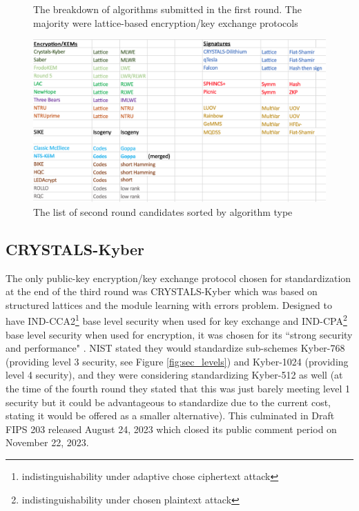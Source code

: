 \begin{figure}
    \centering
        {
            \captionsetup{justification=centering}
            \caption{The breakdown of algorithms submitted in the first round. The majority were lattice-based encryption/key exchange protocols \cite{moody_lets_2018}}
            \label{fig:algosbreakdown}
        }
\end{figure}
\begin{figure}
    \centering
    \includegraphics[width=0.75\linewidth]{Images/algos_sorted.png}
    \caption{The list of second round candidates sorted by algorithm type \cite{moody_round2}}
    \label{fig:algossorted}
\end{figure}

\subsection{CRYSTALS-Kyber}
The only public-key encryption/key exchange protocol chosen for standardization at the end of the third round was CRYSTALS-Kyber which was based on structured lattices and the module learning with errors problem. Designed to have IND-CCA2\footnote{indistinguishability under adaptive chose ciphertext attack} 
base level security when used for key exchange and IND-CPA\footnote{indistinguishability under chosen plaintext attack} 
base level security when used for encryption, it was chosen for its ``strong security and performance" \cite{moody_fourth}. NIST stated they would standardize sub-schemes Kyber-768 (providing level 3 security, see Figure \ref{fig:sec_levels}) and Kyber-1024 (providing level 4 security), and they were considering standardizing Kyber-512 as well (at the time of the fourth round they stated that this was just barely meeting level 1 security but it could be advantageous to standardize due to the current cost, stating it would be offered as a smaller alternative). This culminated in Draft FIPS 203 released August 24, 2023 which closed its public comment period on November 22, 2023.

